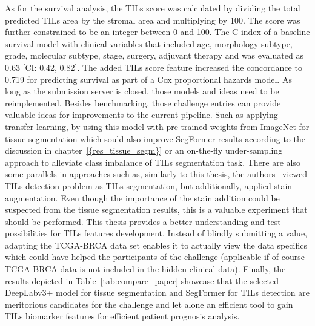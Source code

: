 As for the survival analysis, the TILs score was calculated by dividing the total predicted
TILs area by the stromal area and multiplying by 100. The score was further constrained to be
an integer between 0 and 100.
The C-index of a baseline survival model with clinical variables that included age, morphology
subtype, grade, molecular subtype, stage, surgery, adjuvant therapy and was evaluated as 0.63
[CI: 0.42, 0.82]. The added TILs score feature increased the concordance to  0.719 for predicting
survival as part of a Cox proportional hazards model. 
As long as the submission server is closed, those models and ideas need to be reimplemented.
Besides benchmarking, those challenge entries can provide valuable ideas for improvements to the current pipeline.
Such as applying transfer-learning, by using this model with pre-trained weights from ImageNet for tissue
segmentation which sould also improve SegFormer results according to the discussion in chapter~\ref{{res_tissue_segm}}
or an on-the-fly under-sampling approach to alleviate class imbalance of TILs segmentation task.
There are also some parallels in approaches such as, similarly to this thesis, the authors~\cite{shephard2022tiager}
viewed TILs detection problem as TILs segmentation, but additionally, applied stain augmentation. Even though the
importance of the stain addition could be
suspected from the tissue segmentation results, this is a valuable experiment that should be performed.
This thesis provides a better understanding and test possibilities for TILs features development.
Instead of blindly submitting a value, adapting the TCGA-BRCA data set enables it to actually view the data specifics
which could have helped the participants of the challenge (applicable if of course TCGA-BRCA data is not included in
the hidden clinical data).
Finally, the results depicted in Table~\ref{tab:compare_paper} showcase that the selected DeepLabv3+
model for tissue segmentation and SegFormer for TILs detection are meritorious candidates for the
challenge and let alone an efficient tool to gain TILs biomarker features for efficient patient
prognosis analysis.
